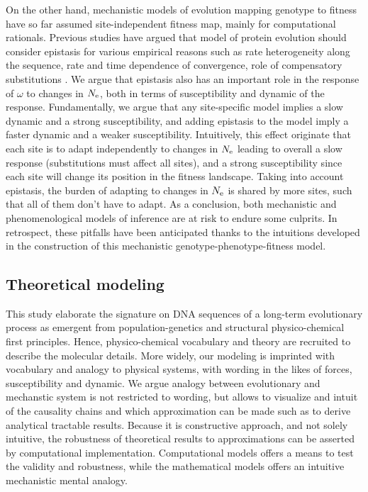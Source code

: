 \documentclass{article}
\begin{document}
	On the other hand, mechanistic models of evolution mapping genotype to fitness have so far assumed site-independent fitness map, mainly for computational rationals.
	Previous studies have argued that model of protein evolution should consider epistasis for various empirical reasons such as rate heterogeneity along the sequence, rate and time dependence of convergence, role of compensatory substitutions \cite{Goldstein2017}.
	We argue that epistasis also has an important role in the response of $\omega$ to changes in $N_{\mathrm{e}}$, both in terms of susceptibility and dynamic of the response.
	Fundamentally, we argue that any site-specific model implies a slow dynamic and a strong susceptibility, and adding epistasis to the model imply a faster dynamic and a weaker susceptibility.
	Intuitively, this effect originate that each site is to adapt independently to changes in $N_{\mathrm{e}}$ leading to overall a slow response (substitutions must  affect all sites), and a strong susceptibility since each site will change its position in the fitness landscape.
	Taking into account epistasis, the burden of adapting to changes in $N_{\mathrm{e}}$ is shared by more sites, such that all of them don't have to adapt. 
	As a conclusion, both mechanistic and phenomenological models of inference are at risk to endure some culprits.
	In retrospect, these pitfalls have been anticipated thanks to the intuitions developed in the construction of this mechanistic genotype-phenotype-fitness model.
	
	\subsection*{Theoretical modeling}
	This study elaborate the signature on DNA sequences of a long-term evolutionary process as emergent from population-genetics and structural physico-chemical first principles.
	Hence, physico-chemical vocabulary and theory are recruited to describe the molecular details.
	More widely, our modeling is imprinted with vocabulary and analogy to physical systems, with wording in the likes of forces, susceptibility and dynamic.
	We argue analogy between evolutionary and mechanstic system is not restricted to wording, but allows to visualize and intuit of the causality chains and which approximation can be made such as to derive analytical tractable results.
	Because it is constructive approach, and not solely intuitive, the robustness of theoretical results to approximations can be asserted by computational implementation. 
	Computational models offers a means to test the validity and robustness, while the mathematical models offers an intuitive mechanistic mental analogy.
	
\end{document}
